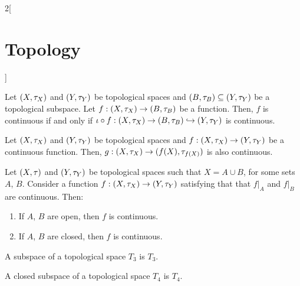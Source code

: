 \documentclass[../../../main.tex]{subfiles}
\begin{document}
\begin{multicols}{2}[\section{Topology}]
\begin{prop}
  \end{prop}
  \begin{prop}
    Let $(X,\tau_X)$ and $(Y,\tau_Y)$ be topological spaces and $(B,\tau_B)\subseteq (Y,\tau_Y)$ be a topological subspace. Let $f:(X,\tau_X)\rightarrow (B,\tau_B)$ be a function. Then, $f$ is continuous if and only if $\iota\circ f:(X,\tau_X)\rightarrow (B,\tau_B)\hookrightarrow (Y,\tau_Y)$ is continuous.
  \end{prop}
  \begin{corollary}
    Let $(X,\tau_X)$ and $(Y,\tau_Y)$ be topological spaces and $f:(X,\tau_X)\rightarrow (Y,\tau_Y)$ be a continuous function. Then, $g:(X,\tau_X)\rightarrow (f(X),\tau_{f(X)})$ is also continuous.
  \end{corollary}
  \begin{prop}
    Let $(X,\tau)$ and $(Y,\tau_Y)$ be topological spaces such that $X=A\cup B$, for some sets $A$, $B$. Consider a function $f:(X,\tau_X)\rightarrow (Y,\tau_Y)$ satisfying that that $f|_A$ and $f|_B$ are continuous. Then:
    \begin{enumerate}
      \item If $A$, $B$ are open, then $f$ is continuous.
      \item If $A$, $B$ are closed, then $f$ is continuous.
    \end{enumerate}
  \end{prop}
  \begin{theorem}
    A subspace of a topological space $T_3$ is $T_3$.
  \end{theorem}
  \begin{theorem}
    A closed subspace of a topological space $T_4$ is $T_4$.
  \end{theorem}

\end{multicols}
\end{document}
